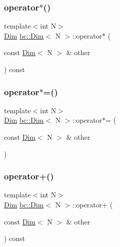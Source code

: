 \subsubsection{\texorpdfstring{operator$\ast$()}{operator*()}}
{\footnotesize\ttfamily template$<$int N$>$ \\
\hyperlink{structbc_1_1Dim}{Dim} \hyperlink{structbc_1_1Dim}{bc\+::\+Dim}$<$ N $>$\+::operator$\ast$ (\begin{DoxyParamCaption}\item[{const \hyperlink{structbc_1_1Dim}{Dim}$<$ N $>$ \&}]{other }\end{DoxyParamCaption}) const\hspace{0.3cm}{\ttfamily [inline]}}

\mbox{\label{structbc_1_1Dim_afa8a30c0b12665058da861c31df813cd}} 
\subsubsection{\texorpdfstring{operator$\ast$=()}{operator*=()}}
{\footnotesize\ttfamily template$<$int N$>$ \\
\hyperlink{structbc_1_1Dim}{Dim} \hyperlink{structbc_1_1Dim}{bc\+::\+Dim}$<$ N $>$\+::operator$\ast$= (\begin{DoxyParamCaption}\item[{const \hyperlink{structbc_1_1Dim}{Dim}$<$ N $>$ \&}]{other }\end{DoxyParamCaption})\hspace{0.3cm}{\ttfamily [inline]}}

\mbox{\label{structbc_1_1Dim_aea1cd55bade7411d37e9ad615c1d357e}} 
\subsubsection{\texorpdfstring{operator+()}{operator+()}}
{\footnotesize\ttfamily template$<$int N$>$ \\
\hyperlink{structbc_1_1Dim}{Dim} \hyperlink{structbc_1_1Dim}{bc\+::\+Dim}$<$ N $>$\+::operator+ (\begin{DoxyParamCaption}\item[{const \hyperlink{structbc_1_1Dim}{Dim}$<$ N $>$ \&}]{other }\end{DoxyParamCaption}) const\hspace{0.3cm}{\ttfamily [inline]}}


